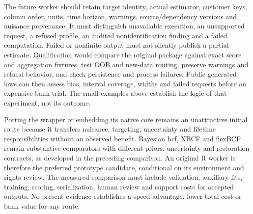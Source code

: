 The future worker should retain target identity, actual estimator, customer keys, column order, units, time horizon, warnings, source/dependency versions and nuisance provenance. It must distinguish unavailable execution, an unsupported request, a refused profile, an audited nonidentification finding and a failed computation. Failed or nonfinite output must not silently publish a partial estimate. Qualification would compare the original package against exact score and aggregation fixtures, test OOB and new-data routing, preserve warnings and refusal behavior, and check persistence and process failures. Public generated laws can then assess bias, interval coverage, widths and failed requests before an expensive bank trial. The small examples above establish the logic of that experiment, not its outcome.

Porting the wrapper or embedding its native core remains an unattractive initial route because it transfers nuisance, targeting, uncertainty and lifetime responsibilities without an observed benefit. Bayesian bcf, XBCF and flexBCF remain substantive comparators with different priors, uncertainty and restoration contracts, as developed in the preceding comparison. An original R worker is therefore the preferred prototype candidate, conditional on its environment and rights review. The measured comparison must include validation, auxiliary fits, training, scoring, serialization, human review and support costs for accepted outputs. No present evidence establishes a speed advantage, lower total cost or bank value for any route.~\citep{exec21_grf_reuse,exec21_cxx_bcf,exec21_cxx_xbcf,exec21_cxx_flexbcf}

